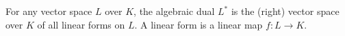 For any vector space $L$ over $K$, the algebraic dual $L^*$ is the (right) vector space over $K$ of all linear forms on $L$. A linear form is a linear map $f: L \to K$.
